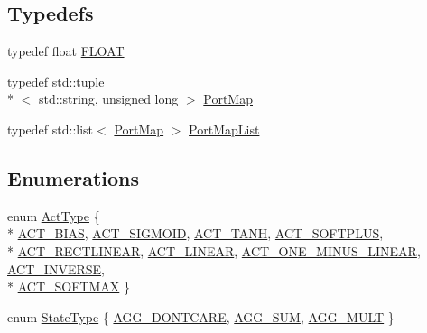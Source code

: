 \subsection*{Typedefs}
\begin{DoxyCompactItemize}
\item 
typedef float \hyperlink{namespacefractal_a1c2d2530689575d5ccb56bae52af70d3}{F\+L\+O\+A\+T}
\item 
typedef std\+::tuple\\*
$<$ std\+::string, unsigned long $>$ \hyperlink{namespacefractal_af1c057caf828f6870c4524aaa6fafc54}{Port\+Map}
\item 
typedef std\+::list$<$ \hyperlink{namespacefractal_af1c057caf828f6870c4524aaa6fafc54}{Port\+Map} $>$ \hyperlink{namespacefractal_a9697dee0746adccf37331470de749c2b}{Port\+Map\+List}
\end{DoxyCompactItemize}
\subsection*{Enumerations}
\begin{DoxyCompactItemize}
\item 
enum \hyperlink{namespacefractal_a6b4f3887f3de57d4b1cbb00d198833ec}{Act\+Type} \{ \\*
\hyperlink{namespacefractal_a6b4f3887f3de57d4b1cbb00d198833ecad9a6664920b3541bab96fee4ef9226d7}{A\+C\+T\+\_\+\+B\+I\+A\+S}, 
\hyperlink{namespacefractal_a6b4f3887f3de57d4b1cbb00d198833ecad79228aab50a1c107bcdbfa529be1b85}{A\+C\+T\+\_\+\+S\+I\+G\+M\+O\+I\+D}, 
\hyperlink{namespacefractal_a6b4f3887f3de57d4b1cbb00d198833eca3e879907718cae2d7762f355d2fe3323}{A\+C\+T\+\_\+\+T\+A\+N\+H}, 
\hyperlink{namespacefractal_a6b4f3887f3de57d4b1cbb00d198833eca0dc23db4bc10d6e8a461086872775608}{A\+C\+T\+\_\+\+S\+O\+F\+T\+P\+L\+U\+S}, 
\\*
\hyperlink{namespacefractal_a6b4f3887f3de57d4b1cbb00d198833ecaccc74ffea0fe8dcbcbbbb6de0e751a61}{A\+C\+T\+\_\+\+R\+E\+C\+T\+L\+I\+N\+E\+A\+R}, 
\hyperlink{namespacefractal_a6b4f3887f3de57d4b1cbb00d198833ecaef31411d2f9dd557d226c83ec8ededed}{A\+C\+T\+\_\+\+L\+I\+N\+E\+A\+R}, 
\hyperlink{namespacefractal_a6b4f3887f3de57d4b1cbb00d198833eca0ad95b2307861206d003120e1a902971}{A\+C\+T\+\_\+\+O\+N\+E\+\_\+\+M\+I\+N\+U\+S\+\_\+\+L\+I\+N\+E\+A\+R}, 
\hyperlink{namespacefractal_a6b4f3887f3de57d4b1cbb00d198833eca67becdba90800166f0d7edb2ab916c04}{A\+C\+T\+\_\+\+I\+N\+V\+E\+R\+S\+E}, 
\\*
\hyperlink{namespacefractal_a6b4f3887f3de57d4b1cbb00d198833ecae33e8292806910b4a5775d855b230148}{A\+C\+T\+\_\+\+S\+O\+F\+T\+M\+A\+X}
 \}
\item 
enum \hyperlink{namespacefractal_a17646dafc0f3fc262f238822cca09f2e}{State\+Type} \{ \hyperlink{namespacefractal_a17646dafc0f3fc262f238822cca09f2ea539d248725917ab8cb897eac721c506f}{A\+G\+G\+\_\+\+D\+O\+N\+T\+C\+A\+R\+E}, 
\hyperlink{namespacefractal_a17646dafc0f3fc262f238822cca09f2eafcfb9237899ae4b7403d98342e6aa449}{A\+G\+G\+\_\+\+S\+U\+M}, 
\hyperlink{namespacefractal_a17646dafc0f3fc262f238822cca09f2ea5ab727a7408a6f23e3c0c93b9f2ce80a}{A\+G\+G\+\_\+\+M\+U\+L\+T}
 \}
\end{DoxyCompactItemize}
